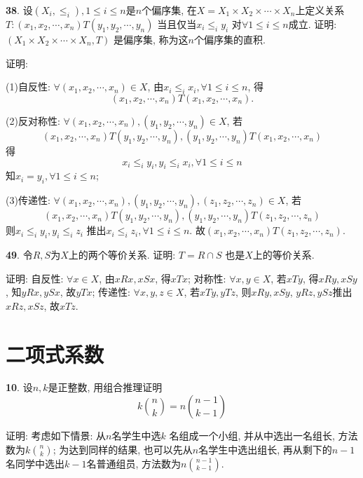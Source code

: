 \par \textbf{38}. 设$(X_i,\le_i),1\le i\le n$是$n$个偏序集, 在$X=X_1\times X_2 \times \cdots\times X_n$上定义关系$T:(x_1,x_2,\cdots,x_n)T(y_1,y_2,\cdots,y_n)$ 当且仅当$x_i\le_i y_i$ 对$\forall 1\le i\le n$成立. 证明: $(X_1\times X_2 \times \cdots\times X_n, T)$ 是偏序集, 称为这$n$个偏序集的直积.
\par 证明:
\par (1)自反性: $\forall (x_1,x_2,\cdots,x_n) \in X$, 由$x_i\le_i x_i, \forall 1\le i\le n$, 得
\begin{displaymath}
(x_1,x_2,\cdots,x_n)T(x_1,x_2,\cdots,x_n).
\end{displaymath}
\par (2)反对称性: $\forall (x_1,x_2,\cdots,x_n),(y_1,y_2,\cdots,y_n) \in X$, 若
\begin{displaymath}
(x_1,x_2,\cdots,x_n)T (y_1,y_2,\cdots,y_n),
(y_1,y_2,\cdots,y_n)T (x_1,x_2,\cdots,x_n)
\end{displaymath}
得
\begin{displaymath}
x_i \le_i y_i, y_i \le_i x_i, \forall 1\le i\le n
\end{displaymath}
知$x_i = y_i,\forall 1\le i\le n$;
\par (3)传递性: $\forall(x_1,x_2,\cdots,x_n),(y_1,y_2,\cdots,y_n),(z_1,z_2,\cdots,z_n) \in X$, 若
\begin{displaymath}
(x_1,x_2,\cdots,x_n)T(y_1,y_2,\cdots,y_n), (y_1,y_2,\cdots,y_n)T(z_1,z_2,\cdots,z_n)
\end{displaymath}
则$x_i\le_iy_i, y_i\le_iz_i$ 推出$x_i\le_iz_i,\forall 1\le i\le n$. 故$(x_1,x_2,\cdots,x_n)T(z_1,z_2,\cdots,z_n)$.

\par \textbf{49}. 令$R,S$为$X$上的两个等价关系. 证明: $T=R\cap S$ 也是$X$上的等价关系.
\par 证明: 自反性: $\forall x\in X$, 由$xRx, xSx$, 得$xTx$; 对称性: $\forall x,y \in X$, 若$xTy$, 得$xRy, xSy$, 知$yRx, ySx$, 故$yTx$; 传递性: $\forall x,y,z \in X$, 若$xTy, yTz$, 则$xRy, xSy$, $yRz, ySz$推出$xRz, xSz$, 故$xTz$.

\section{二项式系数}

\par \textbf{10}. 设$n,k$是正整数, 用组合推理证明
\begin{displaymath}
k\binom{n}{k}=n\binom{n-1}{k-1}
\end{displaymath}
\par 证明: 考虑如下情景: 从$n$名学生中选$k$ 名组成一个小组, 并从中选出一名组长, 方法数为$k\binom{n}{k}$; 为达到同样的结果, 也可以先从$n$名学生中选出组长, 再从剩下的$n-1$ 名同学中选出$k-1$名普通组员, 方法数为$n\binom{n-1}{k-1}$.

